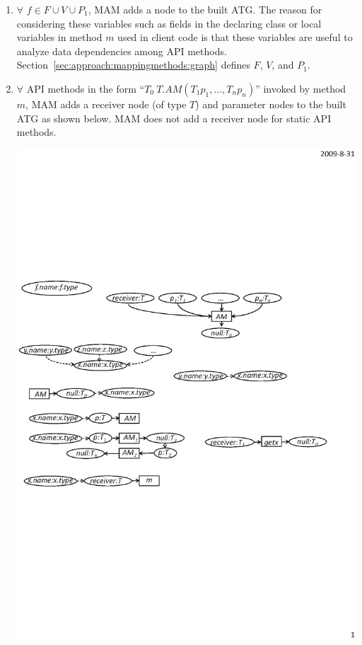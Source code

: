 \begin{enumerate}\vspace*{-2ex}
\item $\forall$ $f \in F \cup V \cup P_1$, MAM adds a node to the built ATG.
The reason for considering these variables such as fields in
the declaring class or local variables in method $m$ used in client code
is that these variables are useful to analyze data dependencies
among API methods. Section~\ref{sec:approach:mappingmethods:graph} defines $F$,  $V$, and $P_1$.\vspace*{-2ex}
\item $\forall$ API methods in the form ``$T_0\ T.AM (T_1 p_1, \ldots, T_n p_n)$''
invoked by method $m$, MAM adds a receiver node (of type $T$) and
parameter nodes to the built ATG as shown below. MAM does
not add a receiver node for static API methods. \vspace*{-2ex}

\begin{center}
\includegraphics[scale=0.7,clip]{figure/rule2.eps}%
\end{center}\vspace*{-3ex}


\end{enumerate}
